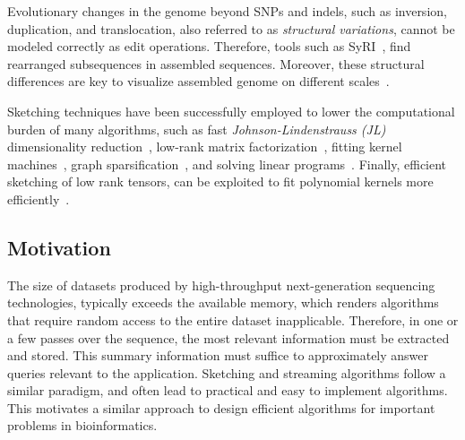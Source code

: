 Evolutionary changes in the genome beyond SNPs and indels, such as inversion, duplication, and translocation, also referred to as \emph{structural variations}, cannot be modeled correctly as edit operations. Therefore, tools such as SyRI~\cite{goel2019syri}, find rearranged subsequences in assembled sequences. Moreover, these structural differences are key to visualize assembled genome on different scales~\cite{Yokoyama2019MoMI}. 

Sketching techniques have been successfully employed to lower the computational burden of many algorithms, such as fast \emph{Johnson-Lindenstrauss (JL)} dimensionality reduction~\cite{AILON2007THENEIGHBORS}, low-rank matrix factorization~\cite{tropp2017practical,yurtsever2017sketchy}, fitting kernel machines~\cite{rahimi2008random}, graph sparsification~\cite{spielman2011spectral}, and solving linear programs~\cite{cohen2019solving}. Finally, efficient sketching of low rank tensors, can be exploited to fit polynomial kernels more efficiently~\cite{pham2013fast}. 


\subsection{Motivation}

The size of datasets produced by  high-throughput next-generation sequencing technologies, typically exceeds the available memory, which renders algorithms that require random access to the entire dataset inapplicable.
Therefore, in one or a few passes over the sequence, the most relevant information must be extracted and stored. 
This summary information must suffice to approximately answer queries relevant to the application.  
Sketching and streaming algorithms follow a similar paradigm, and often lead to practical and easy to implement algorithms. This motivates a similar approach to design efficient algorithms for important problems in bioinformatics. 
